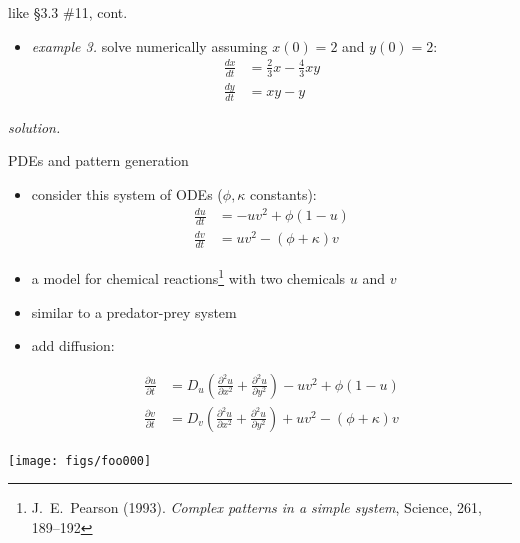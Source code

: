 \documentclass[urlcolor=blue,dvipsnames]{beamer}
\begin{document}
\begin{frame}{like \S3.3 \#11, cont.}

\begin{itemize}
\item \emph{example 3.}  solve numerically assuming $x(0)=2$ and $y(0)=2$:
\begin{align*}
\frac{dx}{dt} &= \frac{2}{3} x - \frac{4}{3} xy \\
\frac{dy}{dt} &= xy - y
\end{align*}
\end{itemize}

\noindent \emph{solution.}


\end{frame}


\begin{frame}{PDEs and pattern generation}

\small
\begin{itemize}
\item consider this system of ODEs ($\phi,\kappa$ constants):
\scriptsize
\begin{align*}
\frac{du}{dt} &= -uv^2+\phi(1-u) \\
\frac{dv}{dt} &= uv^2-(\phi+\kappa)v
\end{align*}
\small
\item a model for chemical reactions\footnote{\tiny J.~E.~Pearson (1993). \emph{Complex patterns in a simple system}, Science, 261, 189--192} with two chemicals $u$ and $v$
\item similar to a predator-prey system
\item add diffusion:

\vspace{-10mm}
\scriptsize
\begin{align*}
\frac{\partial u}{\partial t} &= D_u \left(\frac{\partial^2 u}{\partial x^2} + \frac{\partial^2 u}{\partial y^2}\right) -uv^2+\phi(1-u) \\
\frac{\partial v}{\partial t} &= D_v \left(\frac{\partial^2 u}{\partial x^2} + \frac{\partial^2 u}{\partial y^2}\right) + uv^2-(\phi+\kappa)v
\end{align*}
\small
\end{itemize}

\texttt{[image: figs/foo000]}

\bigskip
\end{frame}
\end{document}
